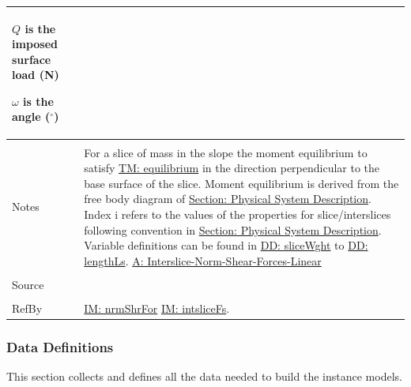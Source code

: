 \documentclass[12pt]{article}
\begin{document}
\begin{minipage}{\textwidth}
\begin{tabular}{p{} p{}}
\begin{symbDescription}
                                 \item{$Q$ is the imposed surface load (N)}
                                 \item{$ω$ is the angle (${}^{\circ}$)}
                                 \end{symbDescription}
                                 \\ \midrule \\
                                 Notes & For a slice of mass in the slope the moment equilibrium to satisfy \hyperref[TM:equilibrium]{TM: equilibrium} in the direction perpendicular to the base surface of the slice. Moment equilibrium is derived from the free body diagram of \hyperref[Sec:PhysSyst]{Section: Physical System Description}. Index i refers to the values of the properties for slice/interslices following convention in \hyperref[Sec:PhysSyst]{Section: Physical System Description}. Variable definitions can be found in \hyperref[DD:sliceWght]{DD: sliceWght} to \hyperref[DD:lengthLs]{DD: lengthLs}. \hyperref[A:Interslice-Norm-Shear-Forces-Linear]{A: Interslice-Norm-Shear-Forces-Linear}
                                         \\ \midrule \\
                                         Source & \cite{chen2005}
                                                  \\ \midrule \\
                                                  RefBy & \hyperref[IM:nrmShrFor]{IM: nrmShrFor} \hyperref[IM:intsliceFs]{IM: intsliceFs}.
\\ \bottomrule \end{tabular}
\end{minipage}
\subsubsection{Data Definitions}
\label{Sec:DDs}
This section collects and defines all the data needed to build the instance models.
\par~
\end{document}
